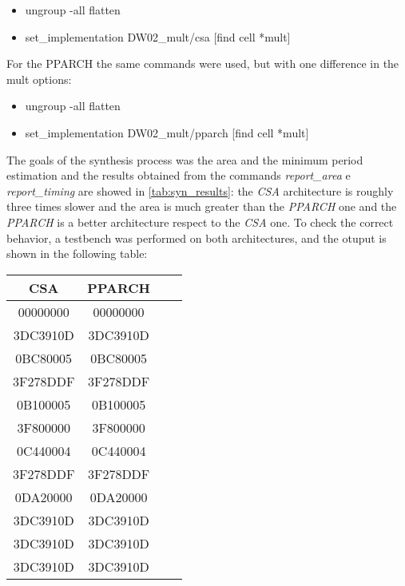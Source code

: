 \begin{itemize}
\item ungroup -all flatten
\item set\_implementation DW02\_mult/csa [find cell *mult]
\end{itemize}
For the PPARCH the same commands were used, but with one difference in the mult options:
\begin{itemize}
\item ungroup -all flatten
\item set\_implementation DW02\_mult/pparch [find cell *mult]
\end{itemize}
The goals of the synthesis process was the area and the minimum period estimation and the results obtained from the commands \textit{report\_area} e \textit{report\_timing} are showed in \autoref{tab:syn_results}: the \textit{CSA} architecture is roughly three times slower and the area is much greater than the \textit{PPARCH} one and the \textit{PPARCH} is a better architecture respect to the \textit{CSA} one.
To check the correct behavior, a testbench was performed on both architectures, and the otuput is shown in the following table:

\begin{table}[H]
\begin{center}
\begin{tabular}{|c|c|c|c|}				\hline
CSA		 	  & PPARCH 					\\ \hline
00000000   	  & 00000000               	\\ \hline
3DC3910D      & 3DC3910D                \\ \hline
0BC80005      & 0BC80005                \\ \hline
3F278DDF      & 3F278DDF                \\ \hline
0B100005      & 0B100005                  \\ \hline
3F800000      & 3F800000              \\ \hline
0C440004      & 0C440004                 \\ \hline
3F278DDF      & 3F278DDF                 \\ \hline
0DA20000      & 0DA20000                   \\ \hline
3DC3910D      & 3DC3910D                 \\ \hline
3DC3910D      & 3DC3910D                   \\ \hline
3DC3910D      & 3DC3910D                   \\ \hline
\end{tabular}
\end{center}
\end{table}

